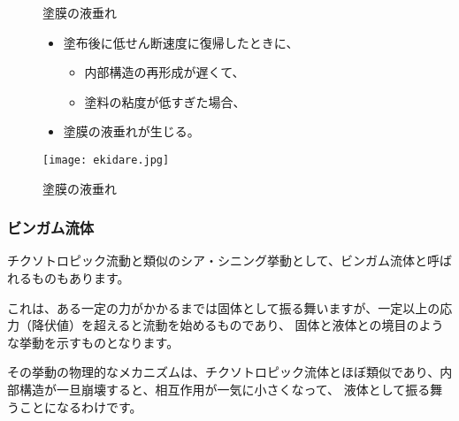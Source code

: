 \documentclass[uplatex,dvipdfmx,a4paper,11pt]{jsarticle}
\begin{document}
\begin{figure}[htb]
	\begin{center}
		\begin{minipage}{0.45\textwidth}
			\begin{itembox}[l]{塗膜の液垂れ}
				\begin{itemize}
					\item 塗布後に低せん断速度に復帰したときに、
					\begin{itemize}
						\item 内部構造の再形成が遅くて、
						\item 塗料の粘度が低すぎた場合、
					\end{itemize}
					\item 塗膜の液垂れが生じる。
				\end{itemize}
			\end{itembox}
		\end{minipage}
		\begin{minipage}{0.45\textwidth}
			\begin{center}
			\texttt{[image: ekidare.jpg]}
			\end{center}
		\end{minipage}
		\caption{塗膜の液垂れ}
		\label{fig:ekidare}
	\end{center}
\end{figure}

\subsubsection{ビンガム流体}

チクソトロピック流動と類似のシア・シニング挙動として、ビンガム流体と呼ばれるものもあります。

これは、ある一定の力がかかるまでは固体として振る舞いますが、一定以上の応力（降伏値）を超えると流動を始めるものであり、
固体と液体との境目のような挙動を示すものとなります。

その挙動の物理的なメカニズムは、チクソトロピック流体とほぼ類似であり、内部構造が一旦崩壊すると、相互作用が一気に小さくなって、
液体として振る舞うことになるわけです。
\end{document}
